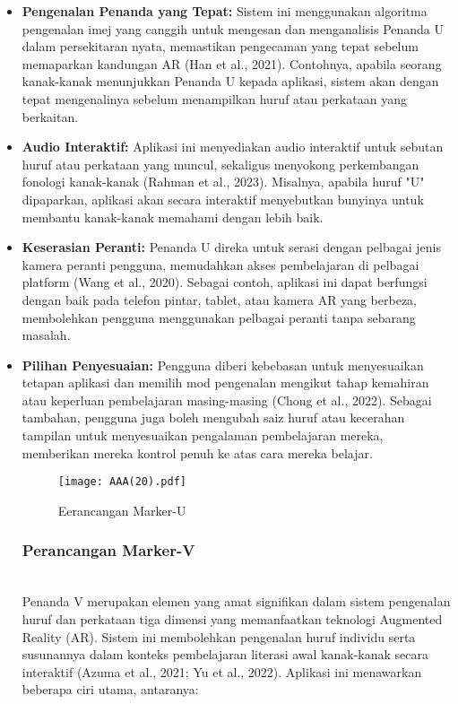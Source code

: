 \begin{itemize}
\begin{itemize}
\begin{itemize}
\begin{itemize}
\begin{itemize}
\item \textbf{Pengenalan Penanda yang Tepat:} Sistem ini menggunakan algoritma pengenalan imej yang canggih untuk mengesan dan menganalisis Penanda U dalam persekitaran nyata, memastikan pengecaman yang tepat sebelum memaparkan kandungan AR (Han et al., 2021). Contohnya, apabila seorang kanak-kanak menunjukkan Penanda U kepada aplikasi, sistem akan dengan tepat mengenalinya sebelum menampilkan huruf atau perkataan yang berkaitan.  \\
\item \textbf{Audio Interaktif:} Aplikasi ini menyediakan audio interaktif untuk sebutan huruf atau perkataan yang muncul, sekaligus menyokong perkembangan fonologi kanak-kanak (Rahman et al., 2023). Misalnya, apabila huruf "U" dipaparkan, aplikasi akan secara interaktif menyebutkan bunyinya untuk membantu kanak-kanak memahami dengan lebih baik.  \\
\item \textbf{Keserasian Peranti:} Penanda U direka untuk serasi dengan pelbagai jenis kamera peranti pengguna, memudahkan akses pembelajaran di pelbagai platform (Wang et al., 2020). Sebagai contoh, aplikasi ini dapat berfungsi dengan baik pada telefon pintar, tablet, atau kamera AR yang berbeza, membolehkan pengguna menggunakan pelbagai peranti tanpa sebarang masalah.  \\
\item \textbf{Pilihan Penyesuaian:} Pengguna diberi kebebasan untuk menyesuaikan tetapan aplikasi dan memilih mod pengenalan mengikut tahap kemahiran atau keperluan pembelajaran masing-masing (Chong et al., 2022). Sebagai tambahan, pengguna juga boleh mengubah saiz huruf atau kecerahan tampilan untuk menyesuaikan pengalaman pembelajaran mereka, memberikan mereka kontrol penuh ke atas cara mereka belajar.  \\

\clearpage
\begin{figure}[h]
     \centering
     \texttt{[image: AAA(20).pdf]}
     \caption{Eerancangan Marker-U}
     \label{fig:enter-label}
 \end{figure}
 
\clearpage
\subsubsection{Perancangan Marker-V} \\
Penanda V merupakan elemen yang amat signifikan dalam sistem pengenalan huruf dan perkataan tiga dimensi yang memanfaatkan teknologi Augmented Reality (AR). Sistem ini membolehkan pengenalan huruf individu serta susunannya dalam konteks pembelajaran literasi awal kanak-kanak secara interaktif (Azuma et al., 2021; Yu et al., 2022). Aplikasi ini menawarkan beberapa ciri utama, antaranya:  \\
 

\end{itemize}
\end{itemize}
\end{itemize}
\end{itemize}
\end{itemize}
